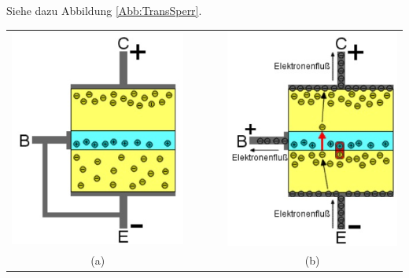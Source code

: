 \begin{ZW}
\begin{Loesung}
Siehe dazu Abbildung \ref{Abb:TransSperr}.


\begin{center}
\begin{tabular}{ccc}
\includegraphics[scale=.6]{pics/gespTrans}
& ~~~~ &
\includegraphics[scale=.6]{pics/durchTrans} \\
(a) && (b)
\end{tabular}
\end{center}
\label{Abb:TransSperr}


\end{Loesung}
\end{ZW}
